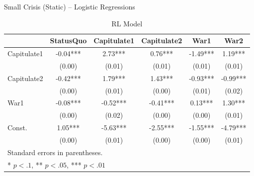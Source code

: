 \begin{table}
	\caption{Small Crisis (Static) -- Logistic Regressions}
	\label{table:sc1_logits}
	\begin{subtable}{\textwidth}
	\begin{center}
	\caption{RL Model}
	\begin{tabular}{lccccc}
		\hline
		            & StatusQuo & Capitulate1 & Capitulate2 &   War1   &   War2     \\
		\hline
		Capitulate1 & -0.04***  & 2.73***     & 0.76***     & -1.49*** & 1.19***    \\
		            & (0.00)    & (0.01)      & (0.01)      & (0.01)   & (0.01)     \\
		Capitulate2 & -0.42***  & 1.79***     & 1.43***     & -0.93*** & -0.99***   \\
		            & (0.00)    & (0.01)      & (0.00)      & (0.01)   & (0.02)     \\
		War1        & -0.08***  & -0.52***    & -0.41***    & 0.13***  & 1.30***    \\
		            & (0.00)    & (0.02)      & (0.00)      & (0.00)   & (0.01)     \\
		Const.      & 1.05***   & -5.63***    & -2.55***    & -1.55*** & -4.79***   \\
		            & (0.00)    & (0.01)      & (0.00)      & (0.00)   & (0.01)     \\
		\hline
		\hline
		\multicolumn{6}{l}{Standard errors in parentheses.} \\
		\multicolumn{6}{l}{* $p<.1$, ** $p<.05$, *** $p<.01$} \\
		\end{tabular}
		\end{center}
		\tableSpace
	\end{subtable}



\end{table}
